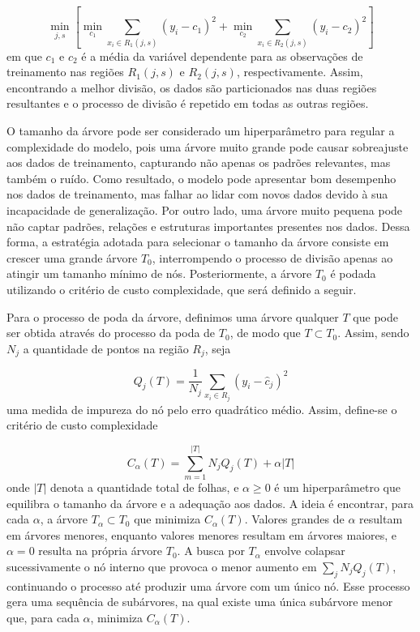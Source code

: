 \documentclass[
  12pt,
  a4paper,
]{scrreprt}
\begin{document}
\[
\min_{j, s}\left[\min_{c_1} \sum_{x_i \in R_1\left(j, s\right)} \left(y_i - c_{1}\right)^2 + \min_{c_2} \sum_{x_i \in R_2\left(j, s\right)} \left(y_i - c_{2}\right)^2\right]
\] em que \(c_1\) e \(c_2\) é a média da variável dependente para as
observações de treinamento nas regiões \(R_1\left(j, s\right)\) e
\(R_2\left(j, s\right)\), respectivamente. Assim, encontrando a melhor
divisão, os dados são particionados nas duas regiões resultantes e o
processo de divisão é repetido em todas as outras regiões.

\vspace{12pt}

O tamanho da árvore pode ser considerado um hiperparâmetro para regular
a complexidade do modelo, pois uma árvore muito grande pode causar
sobreajuste aos dados de treinamento, capturando não apenas os padrões
relevantes, mas também o ruído. Como resultado, o modelo pode apresentar
bom desempenho nos dados de treinamento, mas falhar ao lidar com novos
dados devido à sua incapacidade de generalização. Por outro lado, uma
árvore muito pequena pode não captar padrões, relações e estruturas
importantes presentes nos dados. Dessa forma, a estratégia adotada para
selecionar o tamanho da árvore consiste em crescer uma grande árvore
\(T_0\), interrompendo o processo de divisão apenas ao atingir um
tamanho mínimo de nós. Posteriormente, a árvore \(T_0\) é podada
utilizando o critério de custo complexidade, que será definido a seguir.

\vspace{12pt}

Para o processo de poda da árvore, definimos uma árvore qualquer \(T\)
que pode ser obtida através do processo da poda de \(T_0\), de modo que
\(T \subset T_0\). Assim, sendo \(N_j\) a quantidade de pontos na região
\(R_j\), seja

\[
Q_j\left(T\right) = \frac{1}{N_j} \sum_{x_i \in R_j}\left(y_i - \hat{c}_j\right)^2
\] uma medida de impureza do nó pelo erro quadrático médio. Assim,
define-se o critério de custo complexidade

\[
C_{\alpha}\left(T\right) = \sum_{m = 1}^{|T|}N_jQ_j\left(T\right) + \alpha |T|
\] onde \(|T|\) denota a quantidade total de folhas, e \(\alpha \geq 0\)
é um hiperparâmetro que equilibra o tamanho da árvore e a adequação aos
dados. A ideia é encontrar, para cada \(\alpha\), a árvore
\(T_{\alpha} \subset T_0\) que minimiza \(C_{\alpha}\left(T\right)\).
Valores grandes de \(\alpha\) resultam em árvores menores, enquanto
valores menores resultam em árvores maiores, e \(\alpha = 0\) resulta na
própria árvore \(T_0\). A busca por \(T_{\alpha}\) envolve colapsar
sucessivamente o nó interno que provoca o menor aumento em
\(\sum_j N_j Q_j\left(T\right)\), continuando o processo até produzir
uma árvore com um único nó. Esse processo gera uma sequência de
subárvores, na qual existe uma única subárvore menor que, para cada
\(\alpha\), minimiza \(C_{\alpha}\left(T\right)\).
\end{document}
